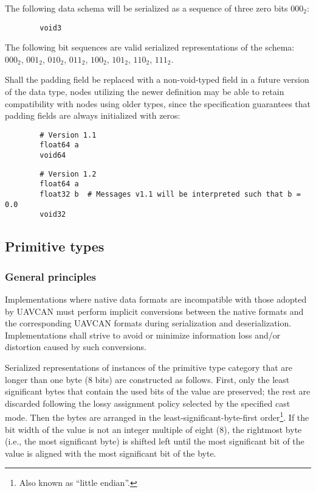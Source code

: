\begin{remark}
    The following data schema will be serialized as a sequence of three zero bits $000_2$:
    \begin{verbatim}
        void3
    \end{verbatim}
    The following bit sequences are valid serialized representations of the schema:
    $000_2$,
    $001_2$,
    $010_2$,
    $011_2$,
    $100_2$,
    $101_2$,
    $110_2$,
    $111_2$.

    Shall the padding field be replaced with a non-void-typed field in a future version of the data type,
    nodes utilizing the newer definition may be able to retain compatibility with nodes using older types,
    since the specification guarantees that padding fields are always initialized with zeros:

    \begin{verbatim}
        # Version 1.1
        float64 a
        void64
    \end{verbatim}

    \begin{verbatim}
        # Version 1.2
        float64 a
        float32 b  # Messages v1.1 will be interpreted such that b = 0.0
        void32
    \end{verbatim}
\end{remark}

\subsection{Primitive types}

\subsubsection{General principles}

Implementations where native data formats are incompatible with those adopted by UAVCAN must perform
implicit conversions between the native formats and the corresponding UAVCAN formats during
serialization and deserialization.
Implementations shall strive to avoid or minimize information loss and/or distortion caused by such conversions.

Serialized representations of instances of the primitive type category that are longer than one byte (8 bits)
are constructed as follows.
First, only the least significant bytes that contain the used bits of the value are preserved;
the rest are discarded following the lossy assignment policy selected by the specified cast mode.
Then the bytes are arranged in the least-significant-byte-first order\footnote{Also known as ``little endian''.}.
If the bit width of the value is not an integer multiple of eight (8),
the rightmost byte (i.e., the most significant byte) is shifted left until the most significant bit of the value
is aligned with the most significant bit of the byte.

